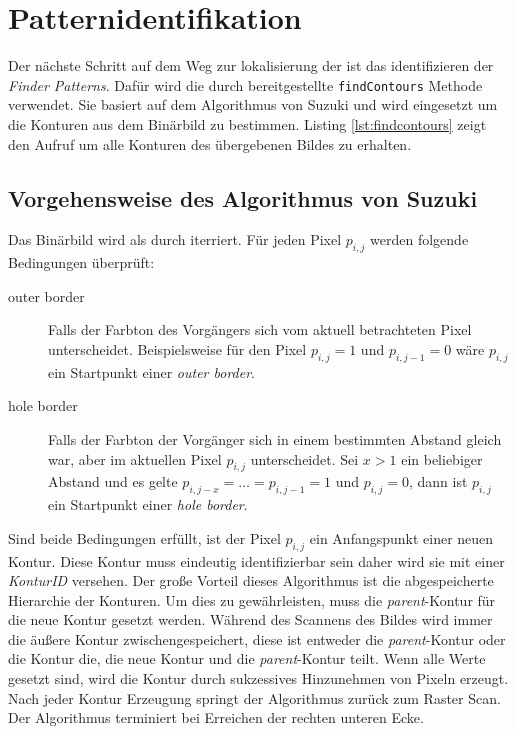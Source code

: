 \chapter{Patternidentifikation}
Der nächste Schritt auf dem Weg zur lokalisierung der \QRCodes ist das identifizieren der \emph{Finder Patterns}. Dafür wird die durch \OpenCV bereitgestellte \texttt{findContours} Methode verwendet. Sie basiert auf dem Algorithmus von Suzuki und wird eingesetzt um die Konturen aus dem Binärbild zu bestimmen.
Listing \ref{lst:findcontours} zeigt den Aufruf um alle Konturen des übergebenen Bildes zu erhalten.

\section{Vorgehensweise des Algorithmus von Suzuki}
Das Binärbild wird als durch iterriert. Für jeden Pixel $p_{i,j}$ werden folgende Bedingungen überprüft:
\begin{description}
	\item[outer border] Falls der Farbton des Vorgängers sich vom aktuell betrachteten Pixel unterscheidet. Beispielsweise für den Pixel $p_{i,j} = 1$ und $p_{i,j-1} = 0$ wäre $p_{i,j}$ ein Startpunkt einer \emph{outer border}. 
	\item[hole border] Falls der Farbton der Vorgänger sich in einem bestimmten Abstand gleich war, aber im aktuellen Pixel $p_{i,j}$ unterscheidet. Sei $x > 1$ ein beliebiger Abstand und es gelte $p_{i,j-x} =\ldots = p_{i,j-1}= 1$ und $p_{i,j} = 0$, dann ist $p_{i,j}$ ein Startpunkt einer \emph{hole border}.
\end{description}
Sind beide Bedingungen erfüllt, ist der Pixel $p_{i,j}$ ein Anfangspunkt einer neuen Kontur. Diese Kontur muss eindeutig identifizierbar sein daher wird sie mit einer \emph{KonturID} versehen. Der große Vorteil dieses Algorithmus ist die abgespeicherte Hierarchie der Konturen. Um dies zu gewährleisten, muss die \emph{parent}-Kontur für die neue Kontur gesetzt werden. Während des Scannens des Bildes wird immer die äußere Kontur zwischengespeichert, diese ist entweder die \emph{parent}-Kontur oder die Kontur die, die neue Kontur und die \emph{parent}-Kontur teilt. Wenn alle Werte gesetzt sind, wird die Kontur durch sukzessives Hinzunehmen von Pixeln erzeugt. Nach jeder Kontur Erzeugung springt der Algorithmus zurück zum Raster Scan. Der Algorithmus terminiert bei Erreichen der rechten unteren Ecke.

